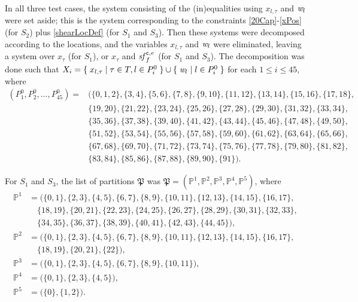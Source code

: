 In all three test cases, the system consisting of the (in)equalities using $x_{l,\tau}$ and $\mathit{w}_l$ were set aside; this is the system corresponding to the constraints \eqref{20Cap}-\eqref{xPos} (for $S_2$) plus \eqref{shearLocDef} (for $S_1$ and $S_3$). Then these systems were decomposed according to the locations, and the variables $x_{l,\tau}$ and $\mathit{w}_l$ were eliminated, leaving a system over $x_\tau$ (for $S_1$), or $x_\tau$ and $\mathit{sf}^{\texttt{c},e}_f$ (for $S_1$ and $S_3$). The decomposition was done such that $X_i = \{\;{x_{l,\tau}}\;|\;{\tau \in T, l\in P^0_i}\;\}\cup\{\;{\mathit{w}_l}\;|\;{l\in P^0_i}\;\}$ for each $1\leq i \leq 45$, where  
\begin{align*}
(P^0_1,P^0_2,\ldots, P^0_{45}) =
&\big(\{0,1,2\}, \{3,4\}, \{5,6\}, \{7,8\}, \{9,10\}, \{11,12\}, \{13,14\}, \{15,16\}, \{17,18\}, \\
&\{19,20\}, \{21,22\},\{23,24\}, \{25,26\}, \{27,28\}, \{29,30\}, \{31,32\}, \{33,34\}, \\
&\{35,36\}, \{37,38\}, \{39,40\}, \{41,42\}, \{43,44\}, \{45,46\}, \{47,48\}, \{49,50\}, \\
&\{51,52\}, \{53,54\}, \{55,56\}, \{57,58\}, \{59,60\}, \{61,62\}, \{63,64\}, \{65,66\}, \\
&\{67,68\}, \{69,70\}, \{71,72\}, \{73,74\}, \{75,76\}, \{77,78\}, \{79,80\}, \{81,82\}, \\
&\{83,84\}, \{85,86\}, \{87,88\}, \{89,90\}, \{91\}\big).
\end{align*}

For $S_1$ and $S_3$, the list of partitions $\mathfrak{P}$ was $\mathfrak{P} = (\mathbb{P}^1, \mathbb{P}^2, \mathbb{P}^3, \mathbb{P}^4, \mathbb{P}^5)$, where 
\begin{align*}
\mathbb{P}^1 &= \big( \{0,1\}, \{2,3\}, \{4,5\}, \{6,7\}, \{8,9\}, \{10,11\}, \{12,13\}, \{14,15\}, \{16,17\},\\
						 & \quad \{18,19\}, \{20,21\}, \{22,23\}, \{24,25\}, \{26,27\}, \{28,29\}, \{30,31\}, \{32,33\},\\
						 & \quad \{34,35\}, \{36,37\}, \{38,39\}, \{40,41\}, \{42,43\}, \{44,45\} \big),\\
\mathbb{P}^2 &= \big( \{0,1\}, \{2,3\}, \{4,5\}, \{6,7\}, \{8,9\}, \{10,11\}, \{12,13\}, \{14,15\}, \{16,17\},\\
						 & \quad \{18,19\}, \{20,21\}, \{22\} \big),\\
\mathbb{P}^3 &= \big( \{0,1\}, \{2,3\}, \{4,5\}, \{6,7\}, \{8,9\}, \{10,11\} \big),\\
\mathbb{P}^4 &= \big( \{0,1\}, \{2,3\}, \{4,5\} \big),\\
\mathbb{P}^5 &= \big(\{0\}, \{1,2\} \big).
\end{align*}

